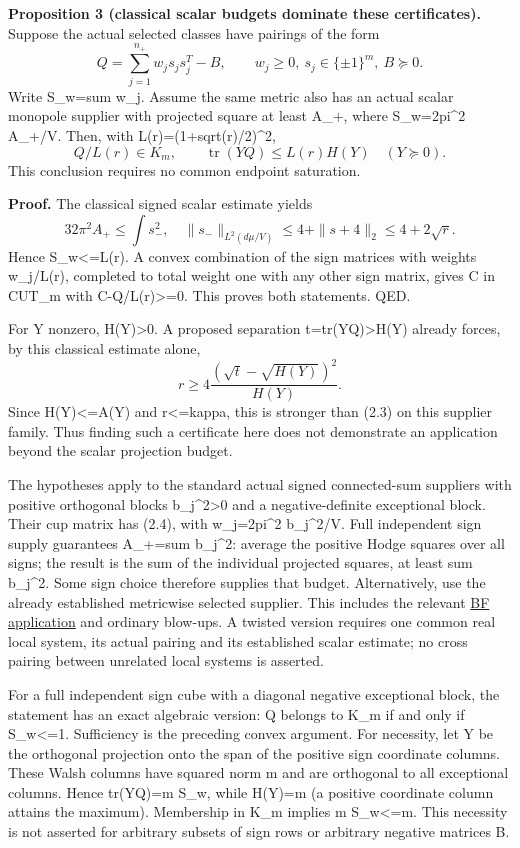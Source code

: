 \documentclass[
  10pt,
]{article}
\begin{document}
\textbf{Proposition 3 (classical scalar budgets dominate these
certificates).} Suppose the actual selected classes have pairings of the
form \[
 Q=\sum_{j=1}^{n_+} w_j s_js_j^T-B,\qquad
 w_j\ge0,\ s_j\in\{\pm1\}^m,\ B\succeq0.                \tag{2.4}
\] Write S\_w=sum w\_j. Assume the same metric also has an actual scalar
monopole supplier with projected square at least A\_+, where
S\_w=2pi\^{}2 A\_+/V. Then, with L(r)=(1+sqrt(r)/2)\^{}2, \[
 Q/L(r)\in K_m,\qquad
 \operatorname{tr}(YQ)\le L(r)H(Y)\quad(Y\succeq0).      \tag{2.5}
\] This conclusion requires no common endpoint saturation.

\textbf{Proof.} The classical signed scalar estimate yields \[
 32\pi^2 A_+\le\int s_-^2,
 \quad\|s_-\|_{L^2(d\mu/V)}\le4+\|s+4\|_2\le4+2\sqrt r.
\] Hence S\_w\textless=L(r). A convex combination of the sign matrices
with weights w\_j/L(r), completed to total weight one with any other
sign matrix, gives C in CUT\_m with C-Q/L(r)\textgreater=0. This proves
both statements. QED.

For Y nonzero, H(Y)\textgreater0. A proposed separation
t=tr(YQ)\textgreater H(Y) already forces, by this classical estimate
alone, \[
 r\ge4\frac{(\sqrt t-\sqrt{H(Y)})^2}{H(Y)}.              \tag{2.6}
\] Since H(Y)\textless=A(Y) and r\textless=kappa, this is stronger than
(2.3) on this supplier family. Thus finding such a certificate here does
not demonstrate an application beyond the scalar projection budget.

The hypotheses apply to the standard actual signed connected-sum
suppliers with positive orthogonal blocks b\_j\^{}2\textgreater0 and a
negative-definite exceptional block. Their cup matrix has (2.4), with
w\_j=2pi\^{}2 b\_j\^{}2/V. Full independent sign supply guarantees
A\_+=sum b\_j\^{}2: average the positive Hodge squares over all signs;
the result is the sum of the individual projected squares, at least sum
b\_j\^{}2. Some sign choice therefore supplies that budget.
Alternatively, use the already established metricwise selected supplier.
This includes the relevant
\href{../mathematics/current/line1_bauer_furuta_geography.md}{BF
application} and ordinary blow-ups. A twisted version requires one
common real local system, its actual pairing and its established scalar
estimate; no cross pairing between unrelated local systems is asserted.

For a full independent sign cube with a diagonal negative exceptional
block, the statement has an exact algebraic version: Q belongs to K\_m
if and only if S\_w\textless=1. Sufficiency is the preceding convex
argument. For necessity, let Y be the orthogonal projection onto the
span of the positive sign coordinate columns. These Walsh columns have
squared norm m and are orthogonal to all exceptional columns. Hence
tr(YQ)=m S\_w, while H(Y)=m (a positive coordinate column attains the
maximum). Membership in K\_m implies m S\_w\textless=m. This necessity
is not asserted for arbitrary subsets of sign rows or arbitrary negative
matrices B.
\end{document}
